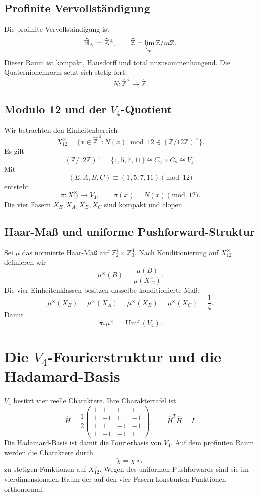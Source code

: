 \documentclass[11pt,a4paper]{article}
\newcommand{\HH}{\mathbb H}
\newcommand{\ZZ}{\mathbb Z}
\newcommand{\Unif}{\operatorname{Unif}}
\begin{document}
\subsection{Profinite Vervollständigung}
Die profinite Vervollständigung ist
\[
\widehat{\HH}_{\ZZ}:=\widehat{\ZZ}^{\,4},\qquad
\widehat{\ZZ}=\varprojlim_m\ZZ/m\ZZ.
\]
Dieser Raum ist kompakt, Hausdorff und total unzusammenhängend. Die Quaternionennorm setzt sich stetig fort:
\[
N:\widehat{\ZZ}^{\,4}\to\widehat{\ZZ}.
\]

\subsection{Modulo 12 und der $V_4$-Quotient}
Wir betrachten den Einheitenbereich
\[
X_{12}^{\times}
=
\{x\in\widehat{\ZZ}^{\,4}:N(x)\bmod 12\in(\ZZ/12\ZZ)^\times\}.
\]
Es gilt
\[
(\ZZ/12\ZZ)^\times=\{1,5,7,11\}\cong C_2\times C_2\cong V_4.
\]
Mit
\[
(E,A,B,C)\equiv(1,5,7,11)\pmod{12}
\]
entsteht
\[
\pi:X_{12}^{\times}\to V_4,\qquad \pi(x)=N(x)\pmod{12}.
\]
Die vier Fasern $X_E,X_A,X_B,X_C$ sind kompakt und clopen.

\subsection{Haar-Maß und uniforme Pushforward-Struktur}
Sei $\mu$ das normierte Haar-Maß auf $\ZZ_2^4\times\ZZ_3^4$. Nach Konditionierung auf $X_{12}^{\times}$ definieren wir
\[
\mu^\times(B)=\frac{\mu(B)}{\mu(X_{12}^{\times})}.
\]
Die vier Einheitenklassen besitzen dasselbe konditionierte Maß:
\[
\mu^\times(X_E)=\mu^\times(X_A)=\mu^\times(X_B)=\mu^\times(X_C)=\frac14.
\]
Damit
\[
\boxed{\pi_*\mu^\times=\Unif(V_4).}
\]

\section{Die $V_4$-Fourierstruktur und die Hadamard-Basis}
$V_4$ besitzt vier reelle Charaktere. Ihre Charaktertafel ist
\[
\widehat H=\frac12
\begin{pmatrix}
1&1&1&1\\
1&-1&1&-1\\
1&1&-1&-1\\
1&-1&-1&1
\end{pmatrix},\qquad \widehat H^T\widehat H=I.
\]
Die Hadamard-Basis ist damit die Fourierbasis von $V_4$. Auf dem profiniten Raum werden die Charaktere durch
\[
\widetilde\chi=\chi\circ\pi
\]
zu stetigen Funktionen auf $X_{12}^{\times}$. Wegen des uniformen Pushforwards sind sie im vierdimensionalen Raum der auf den vier Fasern konstanten Funktionen orthonormal.
\end{document}
